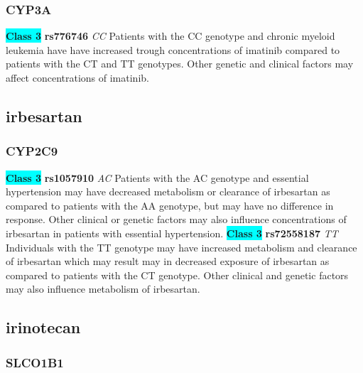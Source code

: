 \documentclass{book}
\begin{document}
\subsubsection{ CYP3A }

\begin{center}
\textbf{\colorbox{cyan} {Class 3}} \textbf{ rs776746 } \textit{ CC }
Patients with the CC genotype and chronic myeloid leukemia have have increased trough concentrations of imatinib compared to patients with the CT and TT genotypes. Other genetic and clinical factors may affect concentrations of imatinib.


\end{center}\subsection{ irbesartan }


\subsubsection{ CYP2C9 }

\begin{center}
\textbf{\colorbox{cyan} {Class 3}} \textbf{ rs1057910 } \textit{ AC }
Patients with the AC genotype and essential hypertension may have decreased metabolism or clearance of irbesartan as compared to patients with the AA genotype, but may have no difference in response. Other clinical or genetic factors may also influence concentrations of irbesartan in patients with essential hypertension. \textbf{\colorbox{cyan} {Class 3}} \textbf{ rs72558187 } \textit{ TT }
Individuals with the TT genotype may have increased metabolism and clearance of irbesartan which may result may in decreased exposure of irbesartan as compared to patients with the CT genotype. Other clinical and genetic factors may also influence metabolism of irbesartan.


\end{center}\subsection{ irinotecan }


\subsubsection{ SLCO1B1 }
\end{document}
